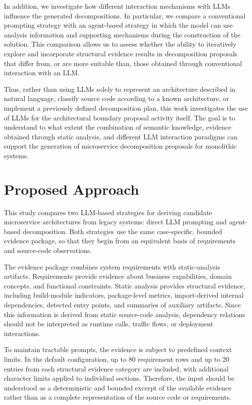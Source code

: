\documentclass[acmsmall,screen,anonymous,review]{acmart}
\begin{document}
In addition, we investigate how different interaction mechanisms with LLMs influence the generated decompositions. In particular, we compare a conventional prompting strategy with an agent-based strategy in which the model can use analysis information and supporting mechanisms during the construction of the solution. This comparison allows us to assess whether the ability to iteratively explore and incorporate structural evidence results in decomposition proposals that differ from, or are more suitable than, those obtained through conventional interaction with an LLM.

Thus, rather than using LLMs solely to represent an architecture described in natural language, classify source code according to a known architecture, or implement a previously defined decomposition plan, this work investigates the use of LLMs for the architectural boundary proposal activity itself. The goal is to understand to what extent the combination of semantic knowledge, evidence obtained through static analysis, and different LLM interaction paradigms can support the generation of microservice decomposition proposals for monolithic systems.

\section{Proposed Approach}

This study compares two LLM-based strategies for deriving candidate microservice architectures from legacy systems: direct LLM prompting and agent-based decomposition. Both strategies use the same case-specific, bounded evidence package, so that they begin from an equivalent basis of requirements and source-code observations.

The evidence package combines system requirements with static-analysis artifacts. Requirements provide evidence about business capabilities, domain concepts, and functional constraints. Static analysis provides structural evidence, including build-module indicators, package-level metrics, import-derived internal dependencies, detected entry points, and summaries of auxiliary artifacts. Since this information is derived from static source-code analysis, dependency relations should not be interpreted as runtime calls, traffic flows, or deployment interactions.

To maintain tractable prompts, the evidence is subject to predefined context limits. In the default configuration, up to 80 requirement rows and up to 20 entries from each structural evidence category are included, with additional character limits applied to individual sections. Therefore, the input should be understood as a deterministic and bounded excerpt of the available evidence rather than as a complete representation of the source code or requirements.
\end{document}
